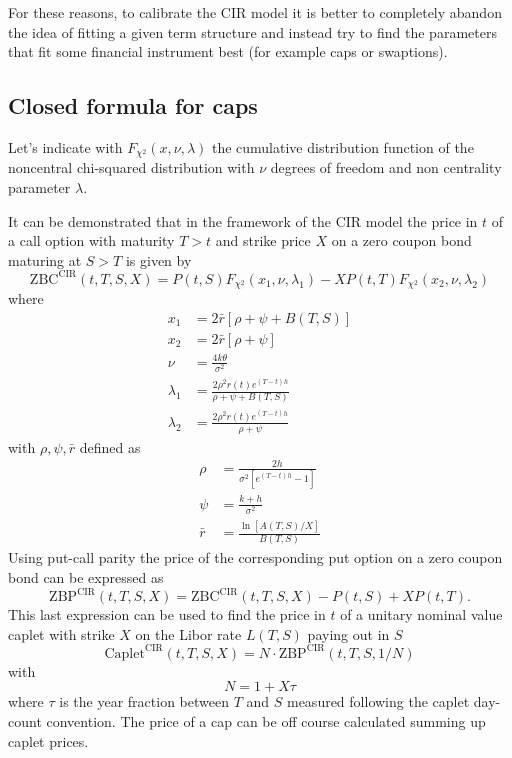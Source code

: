For these reasons, to calibrate the CIR model it is better to completely abandon the idea of fitting a given term structure and instead try to find the parameters that fit some financial instrument best (for example caps or swaptions).

\subsection{Closed formula for caps}

Let's indicate with $F_{\chi^2}(x, \nu, \lambda)$ the cumulative distribution function of the noncentral chi-squared distribution with $\nu$ degrees of freedom and non centrality parameter $\lambda$.

It can be demonstrated that in the framework of the CIR model the price in $t$ of a call option with maturity $T>t$ and strike price $X$ on a zero coupon bond maturing at $S>T$ is given by
\begin{equation}
\mathrm{ZBC}^{\mathrm{CIR}}(t,T,S,X) = P(t,S)F_{\chi^2}(x_1, \nu, \lambda_1) - X P(t,T)F_{\chi^2}(x_2, \nu, \lambda_2)
\end{equation}
where
\begin{align}
x_1 & = 2\bar{r}[\rho + \psi + B(T,S)]\\
x_2 & = 2\bar{r}[\rho + \psi]\\
\nu & = \frac{4k\theta}{\sigma^2}\\
\lambda_1 & = \frac{2\rho^2 r(t) e^{(T-t)h}}{\rho + \psi + B(T,S)}\\
\lambda_2 & = \frac{2\rho^2 r(t) e^{(T-t)h}}{\rho + \psi}
\end{align}
with $\rho, \psi, \bar{r}$ defined as
\begin{align}
\rho & = \frac{2h}{\sigma^2[e^{(T-t)h} - 1]}\\
\psi & = \frac{k+h}{\sigma^2}\\
\bar{r} & = \frac{\ln[A(T,S)/X]}{B(T,S)}
\end{align}
Using put-call parity the price of the corresponding put option on a zero coupon bond can be expressed as
\begin{equation}
\mathrm{ZBP}^{\mathrm{CIR}}(t,T,S,X) = \mathrm{ZBC}^{\mathrm{CIR}}(t,T,S,X) - P(t,S) + X P(t,T).
\end{equation}
This last expression can be used to find the price in $t$ of a unitary nominal value caplet with strike $X$ on the Libor rate $L(T,S)$ paying out in $S$
\begin{equation}
\mathrm{Caplet}^{\mathrm{CIR}}(t,T,S,X) = N\cdot\mathrm{ZBP}^{\mathrm{CIR}}(t,T,S,1/N)
\end{equation}
with
\begin{equation}
N = 1 + X\tau
\end{equation}
where $\tau$ is the year fraction between $T$ and $S$ measured following the caplet day-count convention. The price of a cap can be off course calculated summing up caplet prices.

